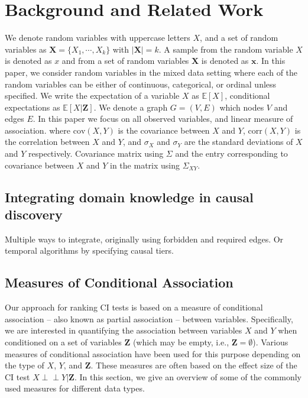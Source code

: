 \documentclass{uai2025} %
\def\ci{\perp\!\!\!\!\!\perp}
\begin{document}

\section{Background and Related Work}
\label{sec:background}
We denote random variables with uppercase letters $ X $, and a set of random
variables as $ \bm{X} = \{X_1, \cdots, X_k\} $ with $ \rvert \bm{X} \rvert = k
$. A sample from the random variable $ X $ is denoted as $ x $ and from a set
of random variables $ \bm{X} $ is denoted as $ \bm{x} $. In this paper, we
consider random variables in the mixed data setting where each of the random
variables can be either of continuous, categorical, or ordinal unless
specified. We write the expectation of a variable $ X $ as $ \mathbb{E}[X] $,
conditional expectations as $ \mathbb{E}[X | \bm{Z}] $. We denote a graph $ G =
(V, E) $ which nodes $ V$ and edges $ E $. In this paper we focus on all
observed variables, and linear measure of association. 
where $ \mathrm{cov}(X, Y) $ is the covariance between $ X $ and $ Y $, $ \mathrm{corr}(X, Y) $ is the correlation between $ X $ and $ Y $, and $
\sigma_X $ and $ \sigma_Y $ are the standard deviations of $ X $ and $ Y $
respectively.  Covariance matrix using $ \Sigma $ and the entry corresponding to
covariance between $ X $ and $ Y $ in the matrix using $ \Sigma_{XY} $.

\subsection{Integrating domain knowledge in causal discovery}
Multiple ways to integrate, originally using forbidden and required edges. Or
temporal algorithms by specifying causal tiers.

\subsection{Measures of Conditional Association}
Our approach for ranking CI tests is based on a measure of conditional
association -- also known as partial association -- between variables.
Specifically, we are interested in quantifying the association between
variables $ X $ and $ Y $ when conditioned on a set of variables $ \bm{Z} $
(which may be empty, i.e., $ \bm{Z} = \emptyset $). Various measures of
conditional association have been used for this purpose depending on the type
of $ X $, $ Y $, and $ \bm{Z} $. These measures are often based on the effect
size of the CI test $ X \ci Y \rvert \bm{Z} $. In this section, we give an
overview of some of the commonly used measures for different data types.
\end{document}
